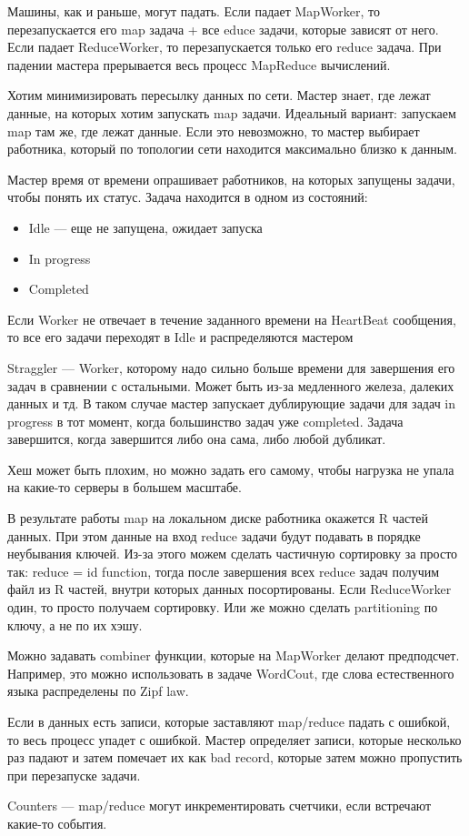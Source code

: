     \quad Машины, как и раньше, могут падать. Если падает MapWorker, то перезапускается его map задача + все educe задачи, которые зависят от него. Если падает ReduceWorker, то перезапускается только его reduce задача. При падении мастера прерывается весь процесс MapReduce вычислений.
    
    \quad Хотим минимизировать пересылку данных по сети. Мастер знает, где лежат данные, на которых хотим запускать map задачи. Идеальный вариант: запускаем map там же, где лежат данные. Если это невозможно, то мастер выбирает работника, который по топологии сети находится максимально близко к данным.
    
    \quad Мастер время от времени опрашивает работников, на которых запущены задачи, чтобы понять их статус. Задача находится в одном из состояний:
    \begin{itemize}
        \item Idle --- еще не запущена, ожидает запуска
        \item In progress
        \item Completed
    \end{itemize}
    Если Worker не отвечает в течение заданного времени на HeartBeat сообщения, то все его задачи переходят в Idle и распределяются мастером
    
    \quad Straggler --- Worker, которому надо сильно больше времени для завершения его задач в сравнении с остальными. Может быть из-за медленного железа, далеких данных и тд. В таком случае мастер запускает дублирующие задачи для задач in progress в тот момент, когда большинство задач уже completed. Задача завершится, когда завершится либо она сама, либо любой дубликат.
    
    \quad Хеш может быть плохим, но можно задать его самому, чтобы нагрузка не упала на какие-то серверы в большем масштабе.
    
    \quad В результате работы map на локальном диске работника окажется R частей данных. При этом данные на вход reduce задачи будут подавать в порядке неубывания ключей. Из-за этого можем сделать частичную сортировку за просто так: reduce = id function, тогда после завершения всех reduce задач получим файл из R частей, внутри которых данных посортированы. Если ReduceWorker один, то просто получаем сортировку. Или же можно сделать partitioning по ключу, а не по их хэшу.
    
    \quad Можно задавать combiner функции, которые на MapWorker делают предподсчет. Например, это можно использовать в задаче WordCout, где слова естественного языка распределены по Zipf law.
    
    \quad Если в данных есть записи, которые заставляют map/reduce падать с ошибкой, то весь процесс упадет с ошибкой. Мастер определяет записи, которые несколько раз падают и затем помечает их как bad record, которые затем можно пропустить при перезапуске задачи.
    
    \quad Counters --- map/reduce могут инкрементировать счетчики, если встречают какие-то события.
